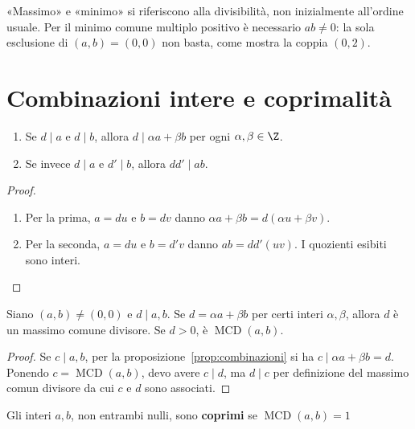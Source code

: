 \begin{osservazione}
«Massimo» e «minimo» si riferiscono alla divisibilità, non inizialmente all'ordine usuale. Per il minimo comune multiplo positivo è necessario $ab\ne0$: la sola esclusione di $(a,b)=(0,0)$ non basta, come mostra la coppia $(0,2)$.
\end{osservazione}

\section{Combinazioni intere e coprimalità}
\begin{proposizione}\label{prop:combinazioni}
\begin{enumerate}[label=\arabic*.]
\item Se $d\mid a$ e $d\mid b$, allora $d\mid\alpha a+\beta b$ per ogni $\alpha,\beta\in\Z$.
\item Se invece $d\mid a$ e $d'\mid b$, allora $dd'\mid ab$.
\end{enumerate}
\end{proposizione}
\begin{proof}
\begin{enumerate}[label=\arabic*.]
\item Per la prima, $a=du$ e $b=dv$ danno $\alpha a+\beta b=d(\alpha u+\beta v)$.
\item Per la seconda, $a=du$ e $b=d'v$ danno $ab=dd'(uv)$. I quozienti esibiti sono interi.
\end{enumerate}
\end{proof}

\begin{proposizione}\label{prop:criterio-mcd}
Siano $(a,b)\ne(0,0)$ e $d\mid a,b$. Se $d=\alpha a+\beta b$ per certi interi $\alpha,\beta$, allora $d$ è un massimo comune divisore. Se $d>0$, è $\operatorname{MCD}(a,b)$.
\end{proposizione}
\begin{proof}
Se $c\mid a,b$, per la proposizione~\ref{prop:combinazioni} si ha $c\mid\alpha a+\beta b=d$. Ponendo $c=\operatorname{MCD}(a,b)$, devo avere $c\mid d$, ma $d\mid c$ per definizione del massimo comun divisore da cui $c$ e $d$ sono associati.
\end{proof}

\begin{definizione}
Gli interi $a,b$, non entrambi nulli, sono \textbf{coprimi} se $\operatorname{MCD}(a,b)=1$
\end{definizione}

